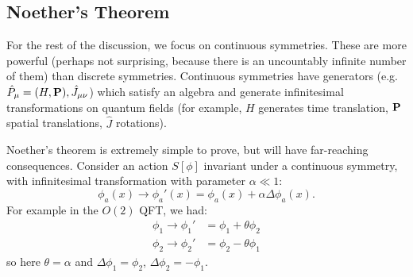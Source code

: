 \subsection{Noether's Theorem}
For the rest of the discussion, we focus on continuous symmetries. These are more powerful (perhaps not surprising, because there is an uncountably infinite number of them) than discrete symmetries. Continuous symmetries have generators (e.g. $\hat{P}_\mu = (H, \mathbf{P}), \hat{J}_{\mu\nu}$) which satisfy an algebra and generate infinitesimal transformations on quantum fields (for example, $H$ generates time translation, $\mathbf{P}$ spatial translations, $\hat{J}$ rotations).

Noether's theorem is extremely simple to prove, but will have far-reaching consequences. Consider an action $S[\phi]$ invariant under a continuous symmetry, with infinitesimal transformation with parameter $\alpha \ll 1$:
\begin{equation}
    \phi_a(x) \to \phi_a'(x) = \phi_a(x) + \alpha \Delta \phi_a(x).
\end{equation}
For example in the $O(2)$ QFT, we had:
\begin{subequations}
    \begin{align}
        \phi_1 \to \phi_1' &= \phi_1 + \theta\phi_2
        \\ \phi_2 \to \phi_2' &= \phi_2 - \theta\phi_1
    \end{align}
\end{subequations}
so here $\theta = \alpha$ and $\Delta\phi_1 = \phi_2$, $\Delta \phi_2 = -\phi_1$.

